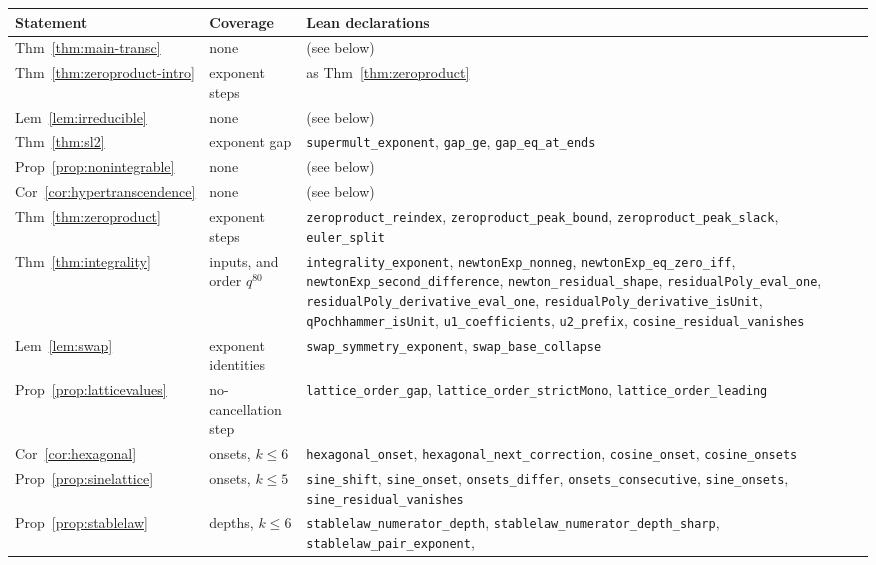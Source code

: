 \documentclass[11pt]{article}
\theoremstyle{plain}
\theoremstyle{definition}
\theoremstyle{remark}
\begin{document}
\begin{center}
\scriptsize
\begin{tabular}{@{}ll>{\raggedright\arraybackslash}p{7.2cm}@{}}
\hline
Statement & Coverage & Lean declarations\\
\hline
Thm~\ref{thm:main-transc} & none & (see below)\\
Thm~\ref{thm:zeroproduct-intro} & exponent steps & as Thm~\ref{thm:zeroproduct}\\
Lem~\ref{lem:irreducible} & none & (see below)\\
Thm~\ref{thm:sl2} & exponent gap & \texttt{supermult\_exponent}, \texttt{gap\_ge},
  \texttt{gap\_eq\_at\_ends}\\
Prop~\ref{prop:nonintegrable} & none & (see below)\\
Cor~\ref{cor:hypertranscendence} & none & (see below)\\
Thm~\ref{thm:zeroproduct} & exponent steps & \texttt{zeroproduct\_reindex},
  \texttt{zeroproduct\_peak\_bound}, \texttt{zeroproduct\_peak\_slack}, \texttt{euler\_split}\\
Thm~\ref{thm:integrality} & inputs, and order $q^{80}$ & \texttt{integrality\_exponent},
  \texttt{newtonExp\_nonneg}, \texttt{newtonExp\_eq\_zero\_iff},
  \texttt{newtonExp\_second\_difference}, \texttt{newton\_residual\_shape},
  \texttt{residualPoly\_eval\_one}, \texttt{residualPoly\_derivative\_eval\_one},
  \texttt{residualPoly\_derivative\_isUnit}, \texttt{qPochhammer\_isUnit},
  \texttt{u1\_coefficients}, \texttt{u2\_prefix}, \texttt{cosine\_residual\_vanishes}\\
Lem~\ref{lem:swap} & exponent identities & \texttt{swap\_symmetry\_exponent},
  \texttt{swap\_base\_collapse}\\
Prop~\ref{prop:latticevalues} & no-cancellation step & \texttt{lattice\_order\_gap},
  \texttt{lattice\_order\_strictMono}, \texttt{lattice\_order\_leading}\\
Cor~\ref{cor:hexagonal} & onsets, $k\le6$ & \texttt{hexagonal\_onset},
  \texttt{hexagonal\_next\_correction}, \texttt{cosine\_onset}, \texttt{cosine\_onsets}\\
Prop~\ref{prop:sinelattice} & onsets, $k\le5$ & \texttt{sine\_shift}, \texttt{sine\_onset},
  \texttt{onsets\_differ}, \texttt{onsets\_consecutive}, \texttt{sine\_onsets},
  \texttt{sine\_residual\_vanishes}\\
Prop~\ref{prop:stablelaw} & depths, $k\le6$ & \texttt{stablelaw\_numerator\_depth},
  \texttt{stablelaw\_numerator\_depth\_sharp}, \texttt{stablelaw\_pair\_exponent},

\end{tabular}
\end{center}
\end{document}

